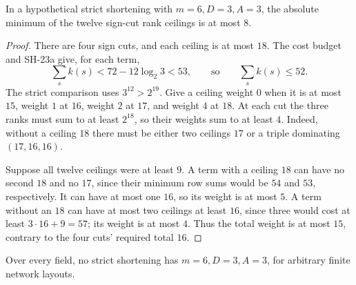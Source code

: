 \begin{lemma}
\label{lem:three-summand-minimum-eight}
In a hypothetical strict shortening with $m=6,D=3,A=3$,
the absolute minimum of the twelve sign-cut rank
ceilings is at most $8$.
\end{lemma}
\begin{proof}
There are four sign cuts, and each ceiling is at most
$18$.  The cost budget and SH-23a give, for each term,
\[
 \sum_s k(s)<72-12\log_2 3<53,
 \qquad\text{so}\qquad \sum_s k(s)\le52.
\]
The strict comparison uses $3^{12}>2^{19}$.
Give a ceiling weight $0$ when it is at most $15$,
weight $1$ at $16$, weight $2$ at $17$, and weight
$4$ at $18$.  At each cut the three ranks must sum
to at least $2^{18}$, so their weights sum to at
least $4$.  Indeed, without a ceiling $18$ there
must be either two ceilings $17$ or a triple
dominating $(17,16,16)$.

Suppose all twelve ceilings were at least $9$.
A term with a ceiling $18$ can have no second $18$
and no $17$, since their minimum row sums would
be $54$ and $53$, respectively.  It can have at
most one $16$, so its weight is at most $5$.
A term without an $18$ can have at most two
ceilings at least $16$, since three would cost
at least $3\cdot16+9=57$; its weight is at most
$4$.  Thus the total weight is at most $15$,
contrary to the four cuts' required total $16$.
\end{proof}

\begin{theorem}
\label{thm:width-six-dimension-three-three-summands}
Over every field, no strict shortening has
$m=6,D=3,A=3$, for arbitrary finite network layouts.
\end{theorem}

